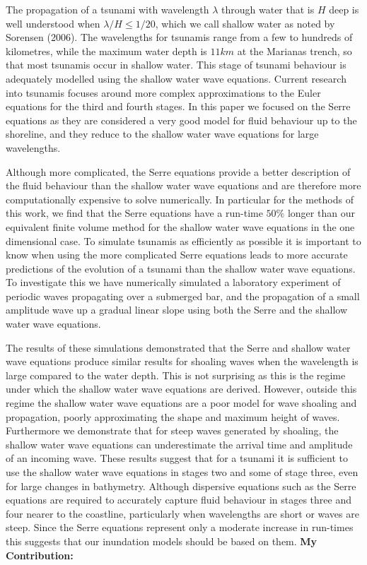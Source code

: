 The propagation of a tsunami with wavelength $\lambda$ through water that is $H$ deep is well understood when $\lambda / H \le 1/ 20$, which we call shallow water as noted by Sorensen (2006). The wavelengths for tsunamis range from a few to hundreds of kilometres, while the maximum water depth is $11km$ at the Marianas trench, so that most tsunamis occur in shallow water. This stage of tsunami behaviour is adequately modelled using the shallow water wave equations. Current research into tsunamis focuses around more complex approximations to the Euler equations for the third and fourth stages. In this paper we focused on the Serre equations as they are considered a very good model for fluid behaviour up to the shoreline, and they reduce to the shallow water wave equations for large wavelengths. 

Although more complicated, the Serre equations provide a better description of the fluid behaviour than the shallow water wave equations and are therefore more computationally expensive to solve numerically. In particular for the methods of this work, we find that the Serre equations have a run-time $50\%$ longer than our equivalent finite volume method for the shallow water wave equations in the one dimensional case. To simulate tsunamis as efficiently as possible it is important to know when using the more complicated Serre equations leads to more accurate predictions of the evolution of a tsunami than the shallow water wave equations. To investigate this we have numerically simulated a laboratory experiment of periodic waves propagating over a submerged bar, and the propagation of a small amplitude wave up a gradual linear slope using both the Serre and the shallow water wave equations.

The results of these simulations demonstrated that the Serre and shallow water wave equations produce similar results for shoaling waves when the wavelength is large compared to the water depth. This is not surprising as this is the regime under which the shallow water wave equations are derived. However, outside this regime the shallow water wave equations are a poor model for wave shoaling and propagation, poorly approximating the shape and maximum height of waves. Furthermore we demonstrate that for steep waves generated by shoaling, the shallow water wave equations can underestimate the arrival time and amplitude of an incoming wave. These results suggest that for a tsunami it is sufficient to use the shallow water wave equations in stages two and some of stage three, even for large changes in bathymetry. Although dispersive equations such as the Serre equations are required to accurately capture fluid behaviour in stages three and four nearer to the coastline, particularly when wavelengths are short or waves are steep. Since the Serre equations represent only a moderate increase in run-times this suggests that our inundation models should be based on them.
\vspace*{\baselineskip}
	\noindent\textbf{My Contribution:}
	

